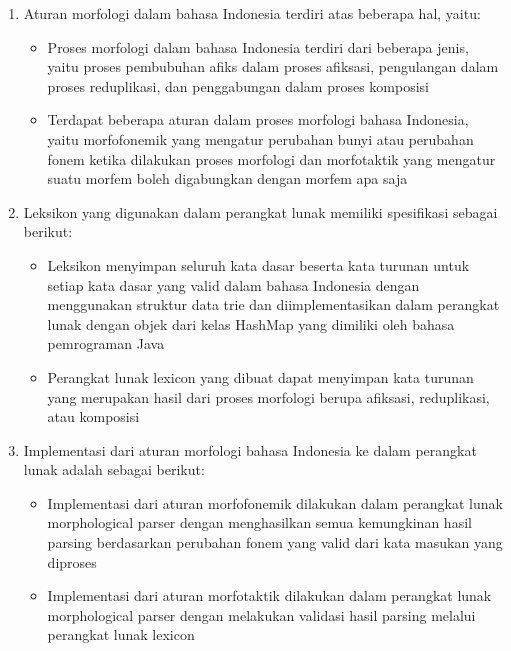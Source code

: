 \begin{enumerate}
	\item Aturan morfologi dalam bahasa Indonesia terdiri atas beberapa hal, yaitu:
	\begin{itemize}
		\item Proses morfologi dalam bahasa Indonesia terdiri dari beberapa jenis, yaitu proses pembubuhan afiks dalam proses afiksasi, pengulangan dalam proses reduplikasi, dan penggabungan dalam proses komposisi
		\item Terdapat beberapa aturan dalam proses morfologi bahasa Indonesia, yaitu morfofonemik yang mengatur perubahan bunyi atau perubahan fonem ketika dilakukan proses morfologi dan morfotaktik yang mengatur suatu morfem boleh digabungkan dengan morfem apa saja
	\end{itemize}
	
	\item Leksikon yang digunakan dalam perangkat lunak memiliki spesifikasi sebagai berikut:
	\begin{itemize}
		\item Leksikon menyimpan seluruh kata dasar beserta kata turunan untuk setiap kata dasar yang valid dalam bahasa Indonesia dengan menggunakan struktur data trie dan diimplementasikan dalam perangkat lunak dengan objek dari kelas HashMap yang dimiliki oleh bahasa pemrograman Java
		\item Perangkat lunak lexicon yang dibuat dapat menyimpan kata turunan yang merupakan hasil dari proses morfologi berupa afiksasi, reduplikasi, atau komposisi
	\end{itemize}
	
	\item Implementasi dari aturan morfologi bahasa Indonesia ke dalam perangkat lunak adalah sebagai berikut:
	\begin{itemize}
		\item Implementasi dari aturan morfofonemik dilakukan dalam perangkat lunak morphological parser dengan menghasilkan semua kemungkinan hasil parsing berdasarkan perubahan fonem yang valid dari kata masukan yang diproses 
		\item Implementasi dari aturan morfotaktik dilakukan dalam perangkat lunak morphological parser dengan melakukan validasi hasil parsing melalui perangkat lunak lexicon
	\end{itemize}
	

\end{enumerate}
